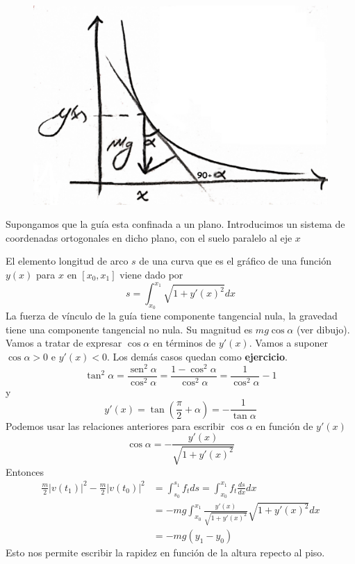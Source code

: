 \documentclass{article}
\DeclareMathOperator{\sen}{sen}
\begin{document}
\begin{figure}
 \begin{center}
 \includegraphics[scale=.06]{imagenes/caida_guia.jpg}
 \end{center}
 \end{figure}
 Supongamos que la guía esta
confinada a un plano. Introducimos un sistema de coordenadas ortogonales en dicho plano, con el suelo paralelo al eje $x$


El elemento longitud de arco $s$ de una curva que es el gráfico de una función $y(x)$ para $x$ en $[x_0,x_1]$ viene dado por 
\[s=\int_{x_0}^{x_1}\sqrt{1+y'(x)^2}dx\]
La fuerza de vínculo de la guía tiene componente tangencial nula,  la gravedad tiene una componente tangencial no nula. 
Su magnitud es $mg\cos\alpha$ (ver dibujo). Vamos a tratar de expresar $\cos\alpha$  en términos de   $y'(x)$. Vamos a suponer $\cos\alpha>0$ e $y'(x)<0$. 
Los demás casos quedan como \textbf{ejercicio}.
\[ \tan^2\alpha=\frac{\sen^2\alpha}{\cos^2\alpha}=\frac{1-\cos^2\alpha}{\cos^2\alpha}=\frac{1}{\cos^2\alpha}-1\]
y
\[y'(x)=\tan \left(\frac{\pi}{2}+\alpha\right)=-\frac{1}{\tan\alpha}\]
Podemos usar las relaciones anteriores para escribir $\cos\alpha$ en función de $y'(x)$
\begin{equation}\label{cos_alpha}\cos\alpha=-\frac{y'(x)}{\sqrt{1+y'(x)^2}}\end{equation}
Entonces
\begin{equation}\label{cons_ener}
 \begin{split} \frac{m}{2}|v(t_1)|^2-\frac{m}{2}|v(t_0)|^2&=\int_{s_0}^{s_1}f_tds =\int_{x_0}^{x_1}f_t\frac{ds}{dx}dx\\
&= -mg\int_{x_0}^{x_1}\frac{y'(x)}{\sqrt{1+y'(x)^2}}\sqrt{1+y'(x)^2}dx\\
&=-mg\left(y_1-y_0\right)
    \end{split}\end{equation}
Esto nos permite escribir la rapidez en función de la altura repecto al piso.
\end{document}
